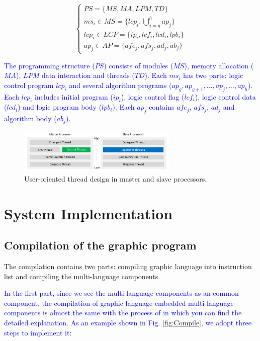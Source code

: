 \documentclass[journal,UTF8]{IEEEtran}
\begin{document}
\begin{equation}
	\left\{
	\begin{array}{l}
	PS = \{MS, MA , LPM, TD\}\\
	ms_i \in MS = \{lcp_i, \bigcup_{j=g}^h ap_j\}\\
	lcp_i \in LCP = \{ip_i, lcf_i, lcd_i, lpb_i\}\\
	ap_j \in AP = \{afe_j, afs_j, ad_j, ab_j\}
	\end{array}
	\right.
	\end{equation}

\textcolor{blue}{The programming structure ($PS$) consists of modules ($MS$), memory allocation ($MA$), $LPM$ data interaction and threads ($TD$). Each $ms_i$ has two parts: logic control program $lcp_i$ and several algorithm programs ($ap_g, ap_{g+1},..., ap_{j},..., ap_{h}$). Each $lcp_i$ includes initial program ($ip_i$), logic control flag ($lcf_i$), logic control data ($lcd_i$) and logic program body ($lpb_i$). Each $ap_{j}$ contains $afe_{j}$, $afs_{j}$, $ad_{j}$ and algorithm body ($ab_{j}$).}

\begin{figure}
	\centering
	\includegraphics[width=3in]{fig/FIG5.pdf}
	\caption{ User-oriented thread design in master and slave processors.}
	\label{fig:Threads}
\end{figure}
 \section{System Implementation}
 \label{Process}
 \subsection{Compilation of the graphic program}
The compilation contains two parts: compiling graphic language into instruction list and compiling the multi-language components.
 	
  \textcolor{blue}{In the first part, since we see the multi-language components as an common component, the compilation of graphic language embedded multi-language components is almost the same with the process of \cite{Yan2010Compiling} in which you can find the detailed explanation. As an example shown in Fig. \ref{fig:Compile}, we adopt three steps to implement it:}
 	
\end{document}
